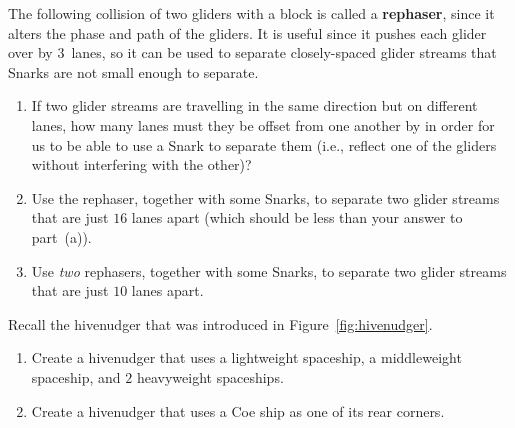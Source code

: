 \begin{multicols}{2}
	
	\mfilbreak
	
	
	\begin{problem}\label{exer:rephaser} 
		The following collision of two gliders with a block is called a \textbf{rephaser}, since it alters the phase and path of the gliders. It is useful since it pushes each glider over by $3$~lanes, so it can be used to separate closely-spaced glider streams that Snarks are not small enough to separate.
		
		\begin{center}
		\end{center}
		
		\begin{enumerate}[label=\bf\color{ocre}(\alph*)]
			\item If two glider streams are travelling in the same direction but on different lanes, how many lanes must they be offset from one another by in order for us to be able to use a Snark to separate them (i.e., reflect one of the gliders without interfering with the other)?
			
			\item Use the rephaser, together with some Snarks, to separate two glider streams that are just $16$ lanes apart (which should be less than your answer to part~(a)).
			
			\item Use \emph{two} rephasers, together with some Snarks, to separate two glider streams that are just $10$ lanes apart.
		\end{enumerate}
	\end{problem}
	
	
	\mfilbreak
	
	
	\begin{problem}\label{exer:hivenudger_modify}
		Recall the hivenudger that was introduced in Figure~\ref{fig:hivenudger}.\smallskip
		
		\begin{enumerate}[label=\bf\color{ocre}(\alph*)]
			\item {} Create a hivenudger that uses a lightweight spaceship, a middleweight spaceship, and $2$ heavyweight spaceships.
			
			\item {} Create a hivenudger that uses a Coe ship as one of its rear corners.
			

\end{enumerate}
\end{problem}
\end{multicols}
